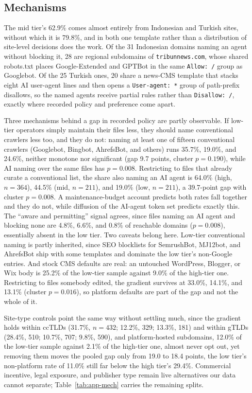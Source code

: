 \documentclass[11pt]{article}
\begin{document}
\subsection{Mechanisms}

The mid tier's 62.9\% comes almost entirely from Indonesian and Turkish sites, without which it is 79.8\%, and in both one template rather than a distribution of site-level decisions does the work. Of the 31 Indonesian domains naming an agent without blocking it, 28 are regional subdomains of \texttt{tribunnews.com}, whose shared robots.txt places Google-Extended and GPTBot in the same \texttt{Allow:~/} group as Googlebot. Of the 25 Turkish ones, 20 share a news-CMS template that stacks eight AI user-agent lines and then opens a \texttt{User-agent:~*} group of path-prefix disallows, so the named agents receive partial rules rather than \texttt{Disallow:~/}, exactly where recorded policy and preference come apart.

Three mechanisms behind a gap in recorded policy are partly observable. If low-tier operators simply maintain their files less, they should name conventional crawlers less too, and they do not: naming at least one of fifteen conventional crawlers (Googlebot, Bingbot, AhrefsBot, and others) runs 35.7\%, 19.0\%, and 24.6\%, neither monotone nor significant (gap 9.7 points, cluster $p = 0.190$), while AI naming over the same files has $p = 0.008$. Restricting to files that already curate a conventional list, the share also naming an AI agent is 64.0\% (high, $n=364$), 44.5\% (mid, $n=211$), and 19.0\% (low, $n=211$), a 39.7-point gap with cluster $p = 0.008$. A maintenance-budget account predicts both rates fall together and they do not, while diffusion of the AI-agent token set predicts exactly this. The ``aware and permitting'' signal agrees, since files naming an AI agent and blocking none are 4.8\%, 6.6\%, and 0.8\% of reachable domains ($p = 0.008$), essentially absent in the low tier. Two caveats belong here. Low-tier conventional naming is partly inherited, since SEO blocklists for SemrushBot, MJ12bot, and AhrefsBot ship with some templates and dominate the low tier's non-Google entries. And stock CMS defaults are real: an untouched WordPress, Blogger, or Wix body is 25.2\% of the low-tier sample against 9.0\% of the high-tier one. Restricting to files somebody edited, the gradient survives at 33.0\%, 14.1\%, and 13.1\% (cluster $p = 0.016$), so platform defaults are part of the gap and not the whole of it.

Site-type controls point the same way without settling much, since the gradient holds within ccTLDs (31.7\%, $n=432$; 12.2\%, 329; 13.3\%, 181) and within gTLDs (28.4\%, 510; 10.7\%, 707; 9.8\%, 590), and platform-hosted subdomains, 12.0\% of the low-tier sample against 2.1\% of the high-tier one, almost never opt out, yet removing them moves the pooled gap only from 19.0 to 18.4 points, the low tier's non-platform rate of 11.0\% still far below the high tier's 29.4\%. Commercial incentive, legal exposure, and publisher type remain live alternatives our data cannot separate; Table~\ref{tab:app-mech} carries the remaining splits.
\end{document}
